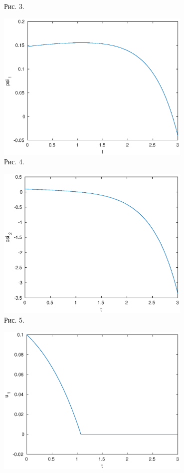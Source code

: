 \documentclass[11pt]{article}
\begin{document}
{{\begin{center}
	{Рис. 3. }
\end{center}
	\begin{center}
	\includegraphics[width=0.7\textwidth]{psi1.eps}\\
	{Рис. 4. }
\end{center}
	\begin{center}
	\includegraphics[width=0.7\textwidth]{psi2.eps}\\
	{Рис. 5. }
\end{center}
	\begin{center}
	\includegraphics[width=0.7\textwidth]{u1t.eps}\\

\end{center}}}
\end{document}
